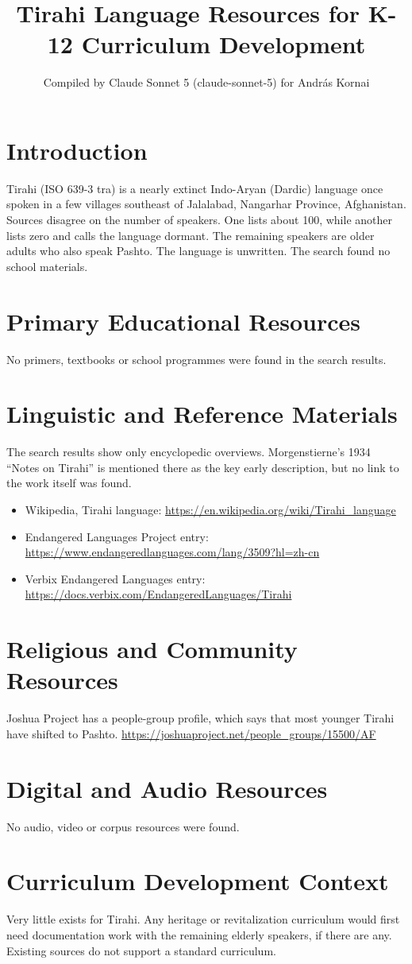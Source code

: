 \documentclass[12pt]{article}
\title{Tirahi Language Resources for K-12 Curriculum Development}
\author{Compiled by Claude Sonnet 5 (claude-sonnet-5) for Andr\'as Kornai}
\date{}
\begin{document}
\maketitle
\section{Introduction}
Tirahi (ISO 639-3 tra) is a nearly extinct Indo-Aryan (Dardic) language once spoken in a few villages southeast of Jalalabad, Nangarhar Province, Afghanistan. Sources disagree on the number of speakers. One lists about 100, while another lists zero and calls the language dormant. The remaining speakers are older adults who also speak Pashto. The language is unwritten. The search found no school materials.
\section{Primary Educational Resources}
No primers, textbooks or school programmes were found in the search results.
\section{Linguistic and Reference Materials}
The search results show only encyclopedic overviews. Morgenstierne's 1934 ``Notes on Tirahi'' is mentioned there as the key early description, but no link to the work itself was found.
\begin{itemize}
\item Wikipedia, Tirahi language: \url{https://en.wikipedia.org/wiki/Tirahi_language}
\item Endangered Languages Project entry: \url{https://www.endangeredlanguages.com/lang/3509?hl=zh-cn}
\item Verbix Endangered Languages entry: \url{https://docs.verbix.com/EndangeredLanguages/Tirahi}
\end{itemize}
\section{Religious and Community Resources}
Joshua Project has a people-group profile, which says that most younger Tirahi have shifted to Pashto. \url{https://joshuaproject.net/people_groups/15500/AF}
\section{Digital and Audio Resources}
No audio, video or corpus resources were found.
\section{Curriculum Development Context}
Very little exists for Tirahi. Any heritage or revitalization curriculum would first need documentation work with the remaining elderly speakers, if there are any. Existing sources do not support a standard curriculum.
\end{document}
